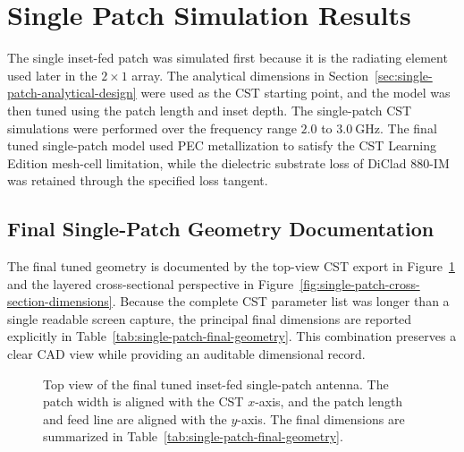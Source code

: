 \section{Single Patch Simulation Results}
\label{sec:single-patch-results}

The single inset-fed patch was simulated first because it is the radiating element used later in the
\(2\times1\) array.  The analytical dimensions in Section~\ref{sec:single-patch-analytical-design} were used as
the CST starting point, and the model was then tuned using the patch length and inset depth.  The
single-patch CST simulations were performed over the frequency range \(2.0\) to
\(3.0~\mathrm{GHz}\).  The final tuned single-patch model used PEC metallization to satisfy the CST
Learning Edition mesh-cell limitation, while the dielectric substrate loss of DiClad 880-IM was
retained through the specified loss tangent.


\subsection{Final Single-Patch Geometry Documentation}
\label{subsec:single-patch-geometry-documentation}

The final tuned geometry is documented by the top-view CST export in
Figure~\ref{fig:single-patch-top-view-dimensions} and the layered cross-sectional perspective in
Figure~\ref{fig:single-patch-cross-section-dimensions}. Because the complete CST parameter list was
longer than a single readable screen capture, the principal final dimensions are reported explicitly in
Table~\ref{tab:single-patch-final-geometry}. This combination preserves a clear CAD view while providing
an auditable dimensional record.

\begin{figure}[H]
    \centering
    \caption[Top view of the final tuned single patch.]{Top view of the final tuned inset-fed single-patch antenna. The patch width is aligned with the CST $x$-axis, and the patch length and feed line are aligned with the $y$-axis. The final dimensions are summarized in Table~\ref{tab:single-patch-final-geometry}.}
    \label{fig:single-patch-top-view-dimensions}
\end{figure}


